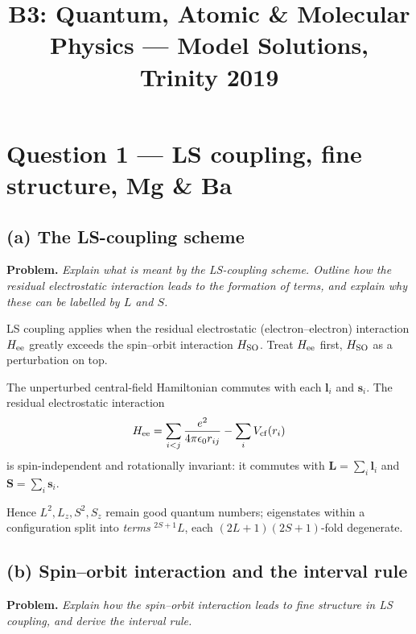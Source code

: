 \documentclass[11pt]{article}
\title{B3: Quantum, Atomic \& Molecular Physics --- Model Solutions, Trinity 2019}
\author{}
\date{}
\begin{document}
\maketitle

\section*{Question 1 --- LS coupling, fine structure, Mg \& Ba}

\subsection*{(a) The LS-coupling scheme}

\textbf{Problem.} \emph{Explain what is meant by the LS-coupling scheme. Outline how the residual electrostatic interaction leads to the formation of terms, and explain why these can be labelled by $L$ and $S$.}

LS coupling applies when the residual electrostatic (electron--electron) interaction $H_{\rm ee}$ greatly exceeds the spin--orbit interaction $H_{\rm SO}$. Treat $H_{\rm ee}$ first, $H_{\rm SO}$ as a perturbation on top.

The unperturbed central-field Hamiltonian commutes with each $\bm l_i$ and $\bm s_i$. The residual electrostatic interaction
\[
H_{\rm ee}=\sum_{i<j}\frac{e^{2}}{4\pi\epsilon_0 r_{ij}}-\sum_i V_{\rm cf}(r_i)
\]
is spin-independent and rotationally invariant: it commutes with $\bm L=\sum_i\bm l_i$ and $\bm S=\sum_i\bm s_i$.

Hence $L^{2},L_z,S^{2},S_z$ remain good quantum numbers; eigenstates within a configuration split into \emph{terms} $^{2S+1}L$, each $(2L+1)(2S+1)$-fold degenerate.

\subsection*{(b) Spin--orbit interaction and the interval rule}

\textbf{Problem.} \emph{Explain how the spin--orbit interaction leads to fine structure in LS coupling, and derive the interval rule.}
\end{document}
